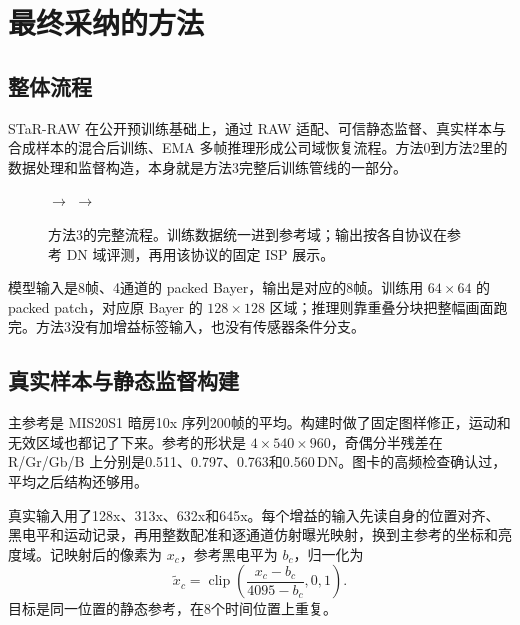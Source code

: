 \documentclass[11pt,a4paper,UTF8,fontset=fandol]{ctexart}
\newcommand{\dn}{\ensuremath{\,\mathrm{DN}}}
\begin{document}
\section{最终采纳的方法}
\label{sec:adopted}

\subsection{整体流程}

STaR-RAW 在公开预训练基础上，通过 RAW 适配、可信静态监督、真实样本与合成样本的混合后训练、EMA 多帧推理形成公司域恢复流程。方法0到方法2里的数据处理和监督构造，本身就是方法3完整后训练管线的一部分。

\begin{figure}[!htbp]
\centering\small
{}
$\longrightarrow$
$\longrightarrow$
\caption{方法3的完整流程。训练数据统一进到参考域；输出按各自协议在参考 DN 域评测，再用该协议的固定 ISP 展示。}
\label{fig:adopted_pipeline}
\end{figure}

模型输入是8帧、4通道的 packed Bayer，输出是对应的8帧。训练用 $64\times64$ 的 packed patch，对应原 Bayer 的 $128\times128$ 区域；推理则靠重叠分块把整幅画面跑完。方法3没有加增益标签输入，也没有传感器条件分支。

\subsection{真实样本与静态监督构建}

主参考是 MIS20S1 暗房10x 序列200帧的平均。构建时做了固定图样修正，运动和无效区域也都记了下来。参考的形状是 $4\times540\times960$，奇偶分半残差在 R/Gr/Gb/B 上分别是0.511、0.797、0.763和0.560\dn。图卡的高频检查确认过，平均之后结构还够用。

真实输入用了128x、313x、632x和645x。每个增益的输入先读自身的位置对齐、黑电平和运动记录，再用整数配准和逐通道仿射曝光映射，换到主参考的坐标和亮度域。记映射后的像素为 $x_c$，参考黑电平为 $b_c$，归一化为
\begin{equation}
 \widetilde{x}_c=\operatorname{clip}\left(\frac{x_c-b_c}{4095-b_c},0,1\right).
 \label{eq:normalization}
\end{equation}
目标是同一位置的静态参考，在8个时间位置上重复。
\end{document}
